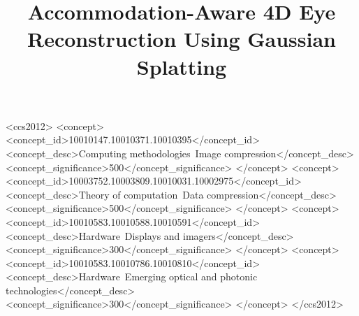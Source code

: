 \documentclass[sigconf, screen, review]{acmart}
\begin{document}
\title{Accommodation-Aware 4D Eye Reconstruction Using Gaussian Splatting}




\renewcommand{\shortauthors}{Peng et al.}


\begin{abstract}
\end{abstract}

\begin{CCSXML}
<ccs2012>
   <concept>
       <concept_id>10010147.10010371.10010395</concept_id>
       <concept_desc>Computing methodologies~Image compression</concept_desc>
       <concept_significance>500</concept_significance>
       </concept>
   <concept>
       <concept_id>10003752.10003809.10010031.10002975</concept_id>
       <concept_desc>Theory of computation~Data compression</concept_desc>
       <concept_significance>500</concept_significance>
       </concept>
   <concept>
       <concept_id>10010583.10010588.10010591</concept_id>
       <concept_desc>Hardware~Displays and imagers</concept_desc>
       <concept_significance>300</concept_significance>
       </concept>
   <concept>
       <concept_id>10010583.10010786.10010810</concept_id>
       <concept_desc>Hardware~Emerging optical and photonic technologies</concept_desc>
       <concept_significance>300</concept_significance>
       </concept>
 </ccs2012>
\end{CCSXML}



\end{document}

